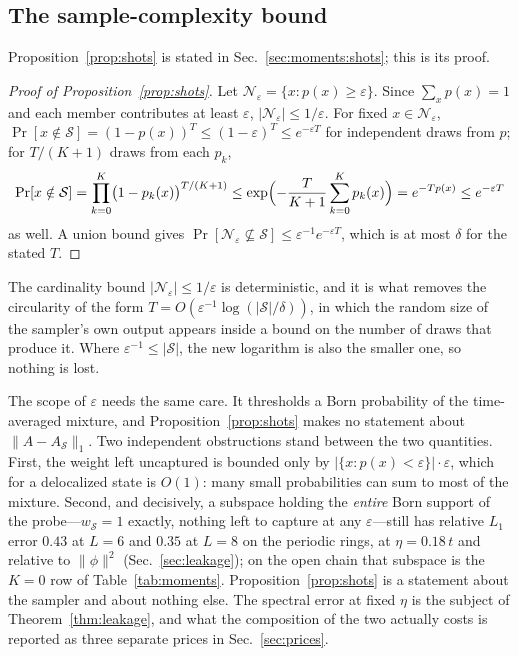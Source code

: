 \subsection{The sample-complexity bound}
\label{app:moments:shots}

Proposition~\ref{prop:shots} is stated in Sec.~\ref{sec:moments:shots}; this is its proof.

\begin{proof}[Proof of Proposition~\ref{prop:shots}]
Let $\mathcal N_\varepsilon=\{x:p(x)\ge\varepsilon\}$. Since $\sum_x p(x)=1$ and each member
contributes at least $\varepsilon$, $|\mathcal N_\varepsilon|\le1/\varepsilon$. For fixed
$x\in\mathcal N_\varepsilon$, $\Pr[x\notin\mathcal S]=(1-p(x))^{T}\le(1-\varepsilon)^{T}\le
e^{-\varepsilon T}$ for independent draws from $p$; for $T/(K{+}1)$ draws from each $p_k$,
\begin{equation*}
\Pr[x\notin\mathcal S]=\prod_{k=0}^{K}\bigl(1-p_k(x)\bigr)^{T/(K+1)}
\le\exp\Bigl(-\frac{T}{K+1}\sum_{k=0}^{K}p_k(x)\Bigr)=e^{-Tp(x)}\le e^{-\varepsilon T}
\end{equation*}
as well. A union bound gives
$\Pr[\mathcal N_\varepsilon\not\subseteq\mathcal S]\le\varepsilon^{-1}e^{-\varepsilon T}$, which is at
most $\delta$ for the stated $T$.
\end{proof}

The cardinality bound $|\mathcal N_\varepsilon|\le1/\varepsilon$ is deterministic, and it is what
removes the circularity of the form $T=O(\varepsilon^{-1}\log(|\mathcal S|/\delta))$, in
which the random size of the sampler's own output appears inside a bound on the number of draws that
produce it. Where $\varepsilon^{-1}\le|\mathcal S|$, the new logarithm is also the smaller one, so
nothing is lost.

The scope of $\varepsilon$ needs the same care. It thresholds a Born probability of the time-averaged
mixture, and Proposition~\ref{prop:shots} makes no statement about $\lVert A-A_{\mathcal S}\rVert_1$.
Two independent obstructions stand between the two quantities. First, the weight left uncaptured is
bounded only by $|\{x:p(x)<\varepsilon\}|\cdot\varepsilon$, which for a delocalized state is $O(1)$:
many small probabilities can sum to most of the mixture. Second, and decisively, a subspace holding the
\emph{entire} Born support of the probe---$w_{\mathcal S}=1$ exactly, nothing left to capture at any
$\varepsilon$---still has relative $L_1$ error $0.43$ at $L=6$ and $0.35$ at $L=8$ on the periodic rings, at
$\eta=0.18\,t$ and relative to $\lVert\phi\rVert^{2}$ (Sec.~\ref{sec:leakage}); on the open chain
that subspace is the $K=0$ row of Table~\ref{tab:moments}.
Proposition~\ref{prop:shots} is a statement about the sampler and about nothing else. The spectral
error at fixed $\eta$ is the subject of Theorem~\ref{thm:leakage}, and what the composition of the two
actually costs is reported as three separate prices in Sec.~\ref{sec:prices}.

